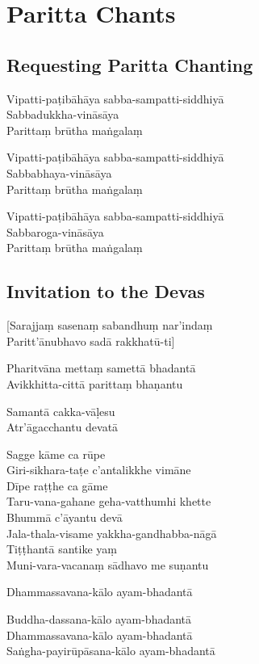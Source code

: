 \chapter{Paritta Chants}

\section{Requesting Paritta Chanting}

\begin{paritta}

Vipatti-paṭibāhāya sabba-sampatti-siddhiyā\\
Sabbadukkha-vināsāya\\
Parittaṃ brūtha maṅgalaṃ

Vipatti-paṭibāhāya sabba-sampatti-siddhiyā\\
Sabbabhaya-vināsāya\\
Parittaṃ brūtha maṅgalaṃ

Vipatti-paṭibāhāya sabba-sampatti-siddhiyā\\
Sabbaroga-vināsāya\\
Parittaṃ brūtha maṅgalaṃ

\end{paritta}

\clearpage

\section{Invitation to the Devas}

\begin{paritta}

[Sarajjaṃ sasenaṃ sabandhuṃ nar'indaṃ\\
Paritt'ānubhavo sadā rakkhatū-ti]

%
Pharitvāna mettaṃ samettā bhadantā\\
Avikkhitta-cittā parittaṃ bhaṇantu

%
Samantā cakka-vāḷesu\\
Atr'āgacchantu devatā

Sagge kāme ca rūpe\\
Giri-sikhara-taṭe c'antalikkhe vimāne\\
Dīpe raṭṭhe ca gāme\\
Taru-vana-gahane geha-vatthumhi khette\\
Bhummā c'āyantu devā\\
Jala-thala-visame yakkha-gandhabba-nāgā\\
Tiṭṭhantā santike yaṃ\\
Muni-vara-vacanaṃ sādhavo me suṇantu

Dhammassavana-kālo ayam-bhadantā


Buddha-dassana-kālo ayam-bhadantā\\
Dhammassavana-kālo ayam-bhadantā\\
Saṅgha-payirūpāsana-kālo ayam-bhadantā
\end{paritta}


